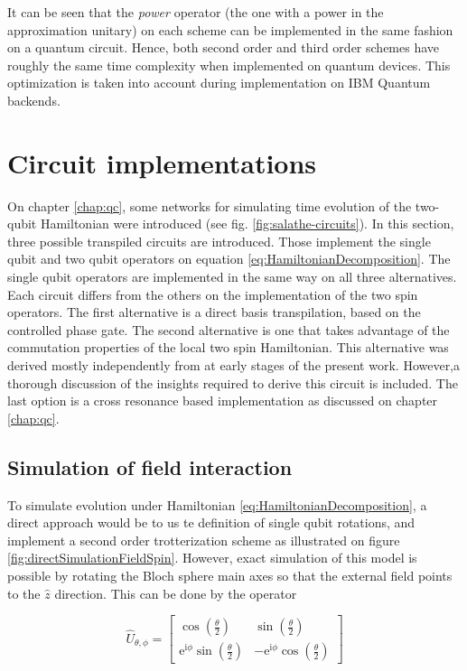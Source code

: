   It can be seen that the \textit{power} operator (the one with a power in the approximation unitary) on each scheme can be implemented in the same fashion on a quantum circuit. Hence, both second order and third order schemes have roughly the same time complexity when implemented on quantum devices. This optimization is taken into account during implementation on IBM Quantum backends.
  
  

\section{Circuit implementations}
\label{sec:MainCircuits}
  
  On chapter \ref{chap:qc}, some networks for simulating time evolution of the two-qubit Hamiltonian were introduced (see fig. \ref{fig:salathe-circuits}). In this section, three possible transpiled circuits are introduced. Those implement the single qubit and two qubit operators on equation \ref{eq:HamiltonianDecomposition}. The single qubit operators are implemented in the same way on all three alternatives. Each circuit differs from the others on the implementation of the two spin operators. The first alternative is a direct basis transpilation, based on the controlled phase gate. The second alternative is one that takes advantage of the commutation properties of the local two spin Hamiltonian. This alternative was derived mostly independently from \cite{BellUniversalCartan} at early stages of the present work. However,a thorough discussion of the insights required to derive this circuit is included. The last option is a cross resonance based implementation as discussed on chapter \ref{chap:qc}.

  \subsection{Simulation of field interaction}

  To simulate evolution under Hamiltonian \ref{eq:HamiltonianDecomposition}, a direct approach would be to us te definition of single qubit rotations, and implement a second order trotterization scheme as illustrated on figure \ref{fig:directSimulationFieldSpin}. However, exact simulation of this model is possible by rotating the Bloch sphere main axes so that the external field points to the $\hat{z}$ direction. This can be done by the operator

  \begin{equation}
    \hat{U}_{\theta,\phi} = \begin{bmatrix}
      \cos(\frac{\theta}{2}) & \sin(\frac{\theta}{2}) \\
      \mathrm{e}^{\mathrm{i}\phi}\sin(\frac{\theta}{2}) & -\mathrm{e}^{\mathrm{i}\phi}\cos(\frac{\theta}{2})
    \end{bmatrix}
    \label{eq:UGate}
  \end{equation}

